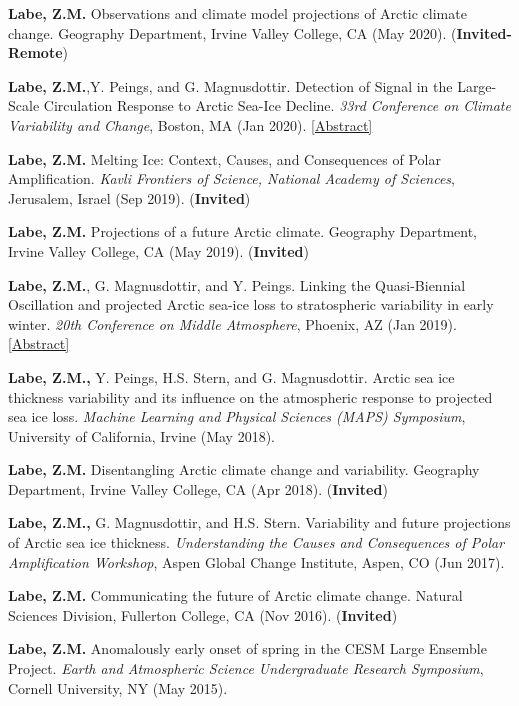 \documentclass[margin,line,palatino,courier,10pt]{res}
\begin{document}
\begin{resume}
\begin{etaremune}[leftmargin=0in,topsep=0in,parsep=0in]
\item \textbf{Labe, Z.M.} Observations and climate model projections of Arctic climate change. Geography Department, Irvine Valley College, CA (May 2020). (\textbf{Invited-Remote})
\item \textbf{Labe, Z.M.},Y. Peings, and G. Magnusdottir. Detection of Signal in the Large-Scale Circulation Response to Arctic Sea-Ice Decline. \textit{33rd Conference on Climate Variability and Change}, Boston, MA (Jan 2020). \href{https://ams.confex.com/ams/2020Annual/meetingapp.cgi/Paper/367289}{[Abstract]}
\item \textbf{Labe, Z.M.} Melting Ice: Context, Causes, and Consequences of Polar Amplification. \textit{Kavli Frontiers of Science, National Academy of Sciences}, Jerusalem, Israel (Sep 2019). (\textbf{Invited}) 
\item \textbf{Labe, Z.M.} Projections of a future Arctic climate. Geography Department, Irvine Valley College, CA (May 2019). (\textbf{Invited})
\item \textbf{Labe, Z.M.}, G. Magnusdottir, and Y. Peings. Linking the Quasi-Biennial Oscillation and projected Arctic sea-ice loss to stratospheric variability in early winter. \textit{20th Conference on Middle Atmosphere}, Phoenix, AZ (Jan 2019). \href{https://ams.confex.com/ams/2019Annual/meetingapp.cgi/Paper/352664}{[Abstract]}
\item \textbf{Labe, Z.M.,} Y. Peings, H.S. Stern, and G. Magnusdottir. Arctic sea ice thickness variability and its influence on the atmospheric response to projected sea ice loss. \textit{Machine Learning and Physical Sciences (MAPS) Symposium}, University of California, Irvine (May 2018). 
\item \textbf{Labe, Z.M.} Disentangling Arctic climate change and variability. Geography Department, Irvine Valley College, CA (Apr 2018). (\textbf{Invited})
\item \textbf{Labe, Z.M.,} G. Magnusdottir, and H.S. Stern. Variability and future projections of Arctic sea ice thickness. \textit{Understanding the Causes and Consequences of Polar Amplification Workshop}, Aspen Global Change Institute, Aspen, CO (Jun 2017). 
\item \textbf{Labe, Z.M.} Communicating the future of Arctic climate change. Natural Sciences Division, Fullerton College, CA (Nov 2016). (\textbf{Invited})
\item \textbf{Labe, Z.M.} Anomalously early onset of spring in the CESM Large Ensemble Project. \textit{Earth and Atmospheric Science Undergraduate Research Symposium}, Cornell University, NY (May 2015). 


\end{etaremune}
\end{resume}
\end{document}
